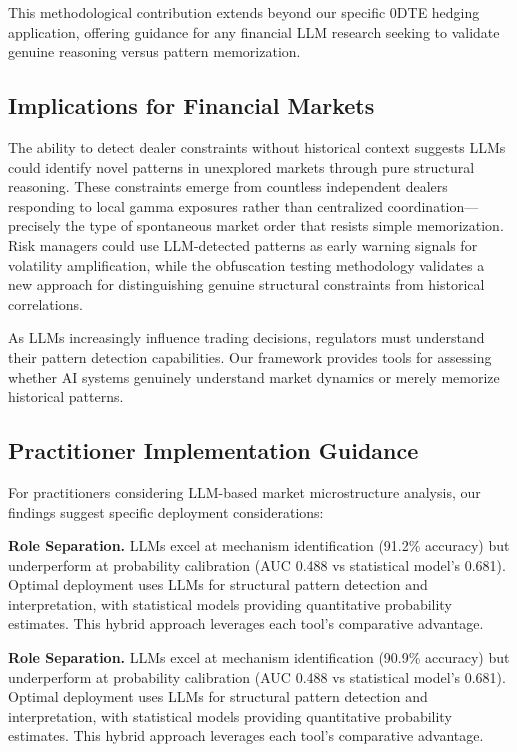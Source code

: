 This methodological contribution extends beyond our specific 0DTE hedging application, offering guidance for any financial LLM research seeking to validate genuine reasoning versus pattern memorization.

\subsection{Implications for Financial Markets}
The ability to detect dealer constraints without historical context suggests LLMs could identify novel patterns in unexplored markets through pure structural reasoning. These constraints emerge from countless independent dealers responding to local gamma exposures rather than centralized coordination—precisely the type of spontaneous market order that resists simple memorization. Risk managers could use LLM-detected patterns as early warning signals for volatility amplification, while the obfuscation testing methodology validates a new approach for distinguishing genuine structural constraints from historical correlations.

As LLMs increasingly influence trading decisions, regulators must understand their pattern detection capabilities. Our framework provides tools for assessing whether AI systems genuinely understand market dynamics or merely memorize historical patterns.

\subsection{Practitioner Implementation Guidance}

For practitioners considering LLM-based market microstructure analysis, our findings suggest specific deployment considerations:

\textbf{Role Separation.} LLMs excel at mechanism identification (91.2\% accuracy) but underperform at probability calibration (AUC 0.488 vs statistical model's 0.681). Optimal deployment uses LLMs for structural pattern detection and interpretation, with statistical models providing quantitative probability estimates. This hybrid approach leverages each tool's comparative advantage.

\textbf{Role Separation.} LLMs excel at mechanism identification (90.9\% accuracy) but underperform at probability calibration (AUC 0.488 vs statistical model's 0.681). Optimal deployment uses LLMs for structural pattern detection and interpretation, with statistical models providing quantitative probability estimates. This hybrid approach leverages each tool's comparative advantage.

